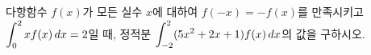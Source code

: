 다항함수 $f(x)$가 모든 실수 $x$에 대하여 $f(-x)=-f(x)$를 만족시키고 $\displaystyle\int_{0}^{2}xf(x)\mkern3mu dx=2$일 때, 정적분 $\displaystyle\int_{-2}^{2}(5x^2+2x+1)f(x)\mkern3mu dx$의 값을 구하시오.
